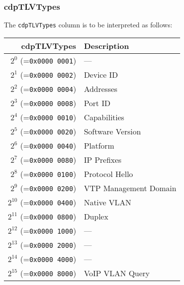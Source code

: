 \documentclass[documentation]{subfiles}
\begin{document}
\subsubsection{cdpTLVTypes}\label{cdpTLVTypes}
The {\tt cdpTLVTypes} column is to be interpreted as follows:\\
\begin{minipage}{.45\textwidth}
    \begin{longtable}{rl}
        \toprule
        {\bf cdpTLVTypes} & {\bf Description}\\
        \midrule\endhead%
        $2^{0}$  (={\tt 0x0000 0001}) & ---\\
        $2^{1}$  (={\tt 0x0000 0002}) & Device ID\\
        $2^{2}$  (={\tt 0x0000 0004}) & Addresses\\
        $2^{3}$  (={\tt 0x0000 0008}) & Port ID\\
        $2^{4}$  (={\tt 0x0000 0010}) & Capabilities\\
        $2^{5}$  (={\tt 0x0000 0020}) & Software Version\\
        $2^{6}$  (={\tt 0x0000 0040}) & Platform\\
        $2^{7}$  (={\tt 0x0000 0080}) & IP Prefixes\\
        $2^{8}$  (={\tt 0x0000 0100}) & Protocol Hello\\
        $2^{9}$  (={\tt 0x0000 0200}) & VTP Management Domain\\
        $2^{10}$ (={\tt 0x0000 0400}) & Native VLAN\\
        $2^{11}$ (={\tt 0x0000 0800}) & Duplex\\
        $2^{12}$ (={\tt 0x0000 1000}) & ---\\
        $2^{13}$ (={\tt 0x0000 2000}) & ---\\
        $2^{14}$ (={\tt 0x0000 4000}) & ---\\
        $2^{15}$ (={\tt 0x0000 8000}) & VoIP VLAN Query\\
        \bottomrule
    \end{longtable}
\end{minipage}
\end{document}
